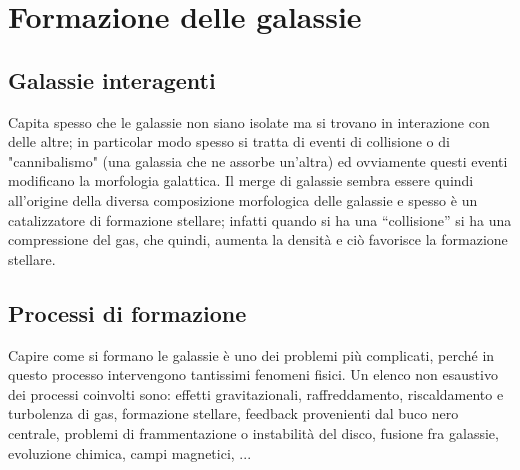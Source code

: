 \section{Formazione delle galassie}\label{sec:formazione-delle-galassie}
\subsection{Galassie interagenti}
Capita spesso che le galassie non siano isolate ma si trovano in interazione con delle altre; in particolar modo spesso si tratta di eventi di collisione o di "cannibalismo" (una galassia che ne assorbe un'altra) ed ovviamente questi eventi modificano la morfologia galattica. Il merge di galassie sembra essere quindi all’origine della diversa composizione morfologica delle galassie e spesso è un catalizzatore di formazione stellare; infatti quando si ha una “collisione” si ha una compressione del gas, che quindi, aumenta la densità e ciò favorisce la formazione stellare.

\subsection{Processi di formazione}
Capire come si formano le galassie è uno dei problemi più complicati, perché in questo processo intervengono tantissimi fenomeni fisici. Un elenco non esaustivo dei processi coinvolti sono: effetti gravitazionali, raffreddamento, riscaldamento e turbolenza di gas, formazione stellare, feedback provenienti dal buco nero centrale, problemi di frammentazione o instabilità del disco, fusione fra galassie, evoluzione chimica, campi magnetici, ...


